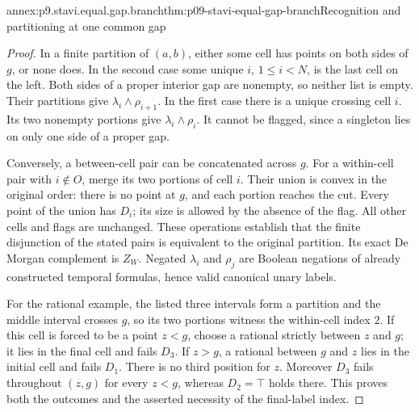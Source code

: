 \begin{annexitem}{annex:p9.stavi.equal.gap.branch}{thm:p09-stavi-equal-gap-branch}{Recognition and partitioning at one common gap}
\begin{proof}
In a finite partition of \((a,b)\),
either some cell has points on
both sides of \(g\), or none
does. In the second case some
unique \(i\), \(1\leq i<N\),
is the last cell on the left.
Both sides of a proper interior
gap are nonempty, so neither
list is empty. Their partitions
give \(\lambda_i\land\rho_{i+1}\).
In the first case there is a
unique crossing cell \(i\).
Its two nonempty portions give
\(\lambda_i\land\rho_i\).
It cannot be flagged, since
a singleton lies on only one
side of a proper gap.

Conversely, a between-cell pair
can be concatenated across \(g\).
For a within-cell pair with
\(i\notin O\), merge its two
portions of cell \(i\).
Their union is convex in the
original order: there is no
point at \(g\), and each
portion reaches the cut.
Every point of the union has
\(D_i\); its size is allowed
by the absence of the flag.
All other cells and flags
are unchanged. These operations
establish that the finite
disjunction of the stated
pairs is equivalent to the
original partition. Its exact
De Morgan complement is
\(Z_W\). Negated \(\lambda_i\)
and \(\rho_j\) are Boolean
negations of already constructed
temporal formulas, hence valid
canonical unary labels.

For the rational example, the
listed three intervals form a
partition and the middle interval
crosses \(g\), so its two
portions witness the within-cell
index \(2\). If this cell is
forced to be a point \(z<g\),
choose a rational strictly
between \(z\) and \(g\);
it lies in the final cell
and fails \(D_3\). If \(z>g\),
a rational between \(g\) and
\(z\) lies in the initial
cell and fails \(D_1\).
There is no third position
for \(z\). Moreover \(D_3\)
fails throughout \((z,g)\)
for every \(z<g\), whereas
\(D_2=\top\) holds there.
This proves both the outcomes
and the asserted necessity
of the final-label index.
\end{proof}
\end{annexitem}


